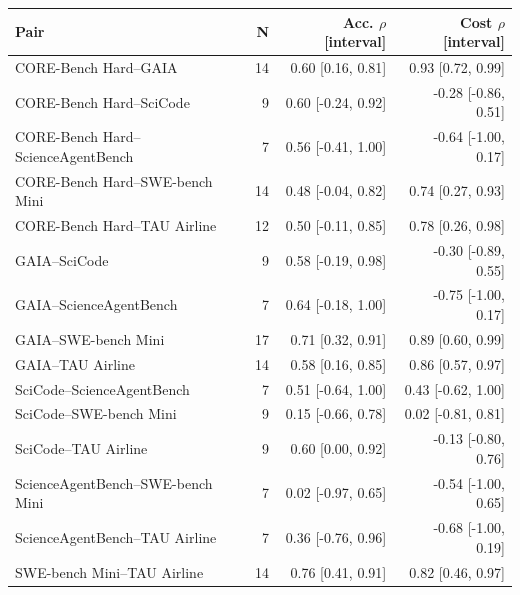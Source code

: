 \begin{tabular}{lrrr}
\toprule
Pair & N & Acc. $\rho$ [interval] & Cost $\rho$ [interval] \\
\midrule
CORE-Bench Hard--GAIA & 14 & 0.60 [0.16, 0.81] & 0.93 [0.72, 0.99] \\
CORE-Bench Hard--SciCode & 9 & 0.60 [-0.24, 0.92] & -0.28 [-0.86, 0.51] \\
CORE-Bench Hard--ScienceAgentBench & 7 & 0.56 [-0.41, 1.00] & -0.64 [-1.00, 0.17] \\
CORE-Bench Hard--SWE-bench Mini & 14 & 0.48 [-0.04, 0.82] & 0.74 [0.27, 0.93] \\
CORE-Bench Hard--TAU Airline & 12 & 0.50 [-0.11, 0.85] & 0.78 [0.26, 0.98] \\
GAIA--SciCode & 9 & 0.58 [-0.19, 0.98] & -0.30 [-0.89, 0.55] \\
GAIA--ScienceAgentBench & 7 & 0.64 [-0.18, 1.00] & -0.75 [-1.00, 0.17] \\
GAIA--SWE-bench Mini & 17 & 0.71 [0.32, 0.91] & 0.89 [0.60, 0.99] \\
GAIA--TAU Airline & 14 & 0.58 [0.16, 0.85] & 0.86 [0.57, 0.97] \\
SciCode--ScienceAgentBench & 7 & 0.51 [-0.64, 1.00] & 0.43 [-0.62, 1.00] \\
SciCode--SWE-bench Mini & 9 & 0.15 [-0.66, 0.78] & 0.02 [-0.81, 0.81] \\
SciCode--TAU Airline & 9 & 0.60 [0.00, 0.92] & -0.13 [-0.80, 0.76] \\
ScienceAgentBench--SWE-bench Mini & 7 & 0.02 [-0.97, 0.65] & -0.54 [-1.00, 0.65] \\
ScienceAgentBench--TAU Airline & 7 & 0.36 [-0.76, 0.96] & -0.68 [-1.00, 0.19] \\
SWE-bench Mini--TAU Airline & 14 & 0.76 [0.41, 0.91] & 0.82 [0.46, 0.97] \\
\bottomrule
\end{tabular}
